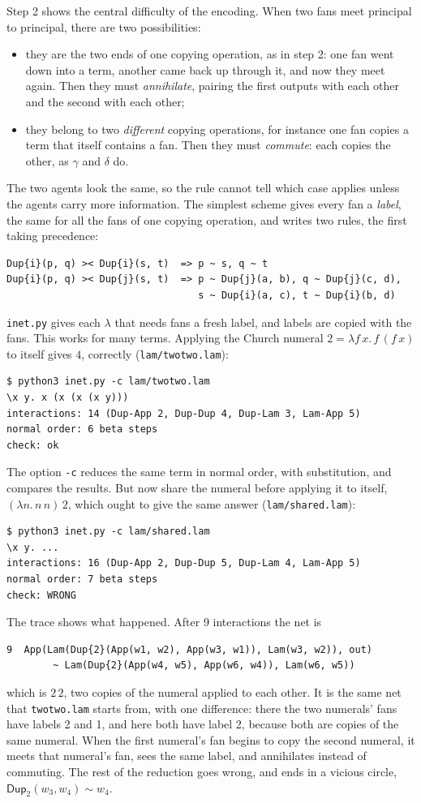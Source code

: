 \documentclass[11pt,a4paper]{article}
\newcommand{\ag}[1]{\mathsf{#1}}
\newcommand{\Dup}{\ag{Dup}}
\newcommand{\eqn}{\mathrel{\sim}}
\theoremstyle{definition}
\theoremstyle{plain}
\begin{document}
Step 2 shows the central difficulty of the encoding. When two fans meet
principal to principal, there are two possibilities:
\begin{itemize}[itemsep=2pt]
\item they are the two ends of one copying operation, as in step 2: one fan
  went down into a term, another came back up through it, and now they meet
  again. Then they must \emph{annihilate}, pairing the first outputs with each
  other and the second with each other;
\item they belong to two \emph{different} copying operations, for instance one
  fan copies a term that itself contains a fan. Then they must
  \emph{commute}: each copies the other, as $\gamma$ and $\delta$ do.
\end{itemize}
The two agents look the same, so the rule cannot tell which case applies
unless the agents carry more information. The simplest scheme gives every
fan a \emph{label}, the same for all the fans of one copying operation, and
writes two rules, the first taking precedence:
\begin{lstlisting}
Dup{i}(p, q) >< Dup{i}(s, t)  => p ~ s, q ~ t
Dup{i}(p, q) >< Dup{j}(s, t)  => p ~ Dup{j}(a, b), q ~ Dup{j}(c, d),
                                 s ~ Dup{i}(a, c), t ~ Dup{i}(b, d)
\end{lstlisting}
\texttt{inet.py} gives each $\lambda$ that needs fans a fresh label, and
labels are copied with the fans. This works for many terms. Applying the
Church numeral $2 = \lambda f\,x.\,f\,(f\,x)$ to itself gives $4$, correctly
(\texttt{lam/twotwo.lam}):
\begin{lstlisting}[style=trace]
$ python3 inet.py -c lam/twotwo.lam
\x y. x (x (x (x y)))
interactions: 14 (Dup-App 2, Dup-Dup 4, Dup-Lam 3, Lam-App 5)
normal order: 6 beta steps
check: ok
\end{lstlisting}
The option \texttt{-c} reduces the same term in normal order, with
substitution, and compares the results. But now share the numeral before
applying it to itself, $(\lambda n.\,n\,n)\,2$, which ought to give the same
answer (\texttt{lam/shared.lam}):
\begin{lstlisting}[style=trace]
$ python3 inet.py -c lam/shared.lam
\x y. ...
interactions: 16 (Dup-App 2, Dup-Dup 5, Dup-Lam 4, Lam-App 5)
normal order: 7 beta steps
check: WRONG
\end{lstlisting}
The trace shows what happened. After 9 interactions the net is
\begin{lstlisting}[style=trace]
   9  App(Lam(Dup{2}(App(w1, w2), App(w3, w1)), Lam(w3, w2)), out)
        ~ Lam(Dup{2}(App(w4, w5), App(w6, w4)), Lam(w6, w5))
\end{lstlisting}
which is $2\,2$, two copies of the numeral applied to each other. It is the
same net that \texttt{twotwo.lam} starts from, with one difference: there the
two numerals' fans have labels 2 and 1, and here both have label 2, because
both are copies of the same numeral. When the first numeral's fan begins to
copy the second numeral, it meets that numeral's fan, sees the same label,
and annihilates instead of commuting. The rest of the reduction goes wrong,
and ends in a vicious circle, $\Dup_2(w_3,w_4) \eqn w_4$.
\end{document}
